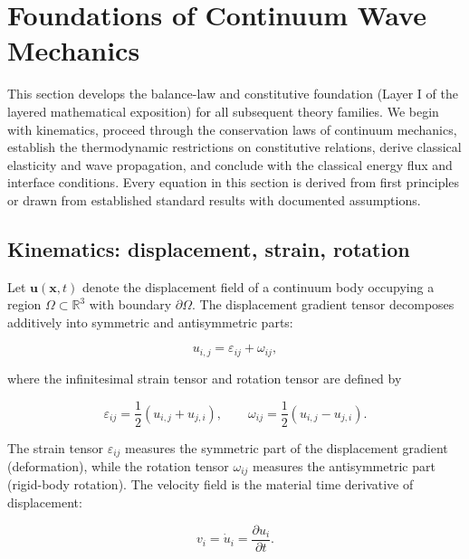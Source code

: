 \section{Foundations of Continuum Wave Mechanics}
\label{sec:foundations}

This section develops the balance-law and constitutive foundation (Layer I of the layered mathematical exposition) for all subsequent theory families. We begin with kinematics, proceed through the conservation laws of continuum mechanics, establish the thermodynamic restrictions on constitutive relations, derive classical elasticity and wave propagation, and conclude with the classical energy flux \cite{Biot1956} and interface conditions. Every equation in this section is derived from first principles or drawn from established standard results with documented assumptions.

\subsection{Kinematics: displacement, strain, rotation}
\label{sec:3.1}

Let $\bm{u}(\bm{x},t)$ denote the displacement field of a continuum body occupying a region $\Omega \subset \mathbb{R}^3$ with boundary $\partial\Omega$. The displacement gradient tensor decomposes additively into symmetric and antisymmetric parts:

\begin{equation}
u_{i,j} = \varepsilon_{ij} + \omega_{ij},
\label{eq:3.1}
\end{equation}

where the infinitesimal strain tensor and rotation tensor are defined by

\begin{equation}
\varepsilon_{ij} = \frac{1}{2}(u_{i,j} + u_{j,i}),
\qquad
\omega_{ij} = \frac{1}{2}(u_{i,j} - u_{j,i}).
\label{eq:3.2}
\end{equation}

The strain tensor $\varepsilon_{ij}$ measures the symmetric part of the displacement gradient (deformation), while the rotation tensor $\omega_{ij}$ measures the antisymmetric part (rigid-body rotation). The velocity field is the material time derivative of displacement:

\begin{equation}
v_i = \dot{u}_i = \frac{\partial u_i}{\partial t}.
\label{eq:3.3}
\end{equation}


